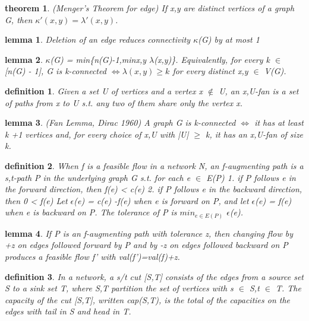\documentclass[twocolumn]{article}
\newtheorem{theorem}{theorem}[section]  %
\newtheorem{definition}{definition}
\newtheorem{lemma}{lemma}
\begin{document}
\begin{CJK*}{UTF8}{bkai}
    \begin{theorem}{(Menger's Theorem for edge)}
         If x,y are distinct vertices of a graph G, then $\kappa'(x,y) = \lambda'(x,y)$.
    \end{theorem}

    \begin{lemma}
         Deletion of an edge reduces connectivity $\kappa$(G) by at most 1
    \end{lemma}

    \begin{lemma}
        $\kappa$(G) = min\{n(G)-1,minx,y $\lambda$(x,y)\}. Equivalently, for every k $\in$ [n(G) - 1],
 G is k-connected $\iff \lambda(x,y) \geq k$ for every distinct x,y $\in$ V(G).
    \end{lemma}

    \begin{definition}
        Given a set U of vertices and a vertex x $\notin $ U, an x,U-fan is a set of paths from
 x to U s.t. any two of them share only the vertex x.
    \end{definition}

    \begin{lemma}{(Fan Lemma, Dirac 1960)}
        A graph G is k-connected $\iff$ it has at least k +1 vertices and, for every choice
 of x,U with |U| $\geq$ k, it has an x,U-fan of size k.
    \end{lemma}

    \begin{definition}
        When f is a feasible flow in a network N, an f-augmenting path is a s,t-path
 P in the underlying graph G s.t. for each e $\in$ E(P)
 1. if P follows e in the forward direction, then f(e) < c(e)
 2. if P follows e in the backward direction, then 0 < f(e)
 Let $\epsilon$(e) = c(e) -f(e) when e is forward on P, and let $\epsilon$(e) = f(e) when e is
 backward on P. The tolerance of P is $min_{e \in E(P)}$ $\epsilon$(e). 
    \end{definition}

    \begin{lemma}
         If P is an f-augmenting path with tolerance z, then changing flow by +z on
 edges followed forward by P and by -z on edges followed backward on P
 produces a feasible flow f' with val(f')=val(f)+z.
    \end{lemma}

    \begin{definition}
        In a network, a s/t cut [S,T] consists of the edges from a source set S to a
 sink set T, where S,T partition the set of vertices with s $\in$ S,t $\in$ T. The
 capacity of the cut [S,T], written cap(S,T), is the total of the capacities on
 the edges with tail in S and head in T. 
    \end{definition}


\end{CJK*}
\end{document}
